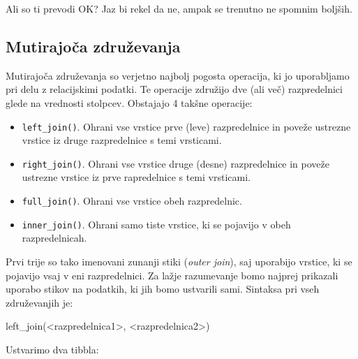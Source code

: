 \documentclass[
]{book}
\newenvironment{Shaded}{\begin{snugshade}}{\end{snugshade}}
\newcommand{\FunctionTok}[1]{\textcolor[rgb]{0.00,0.00,0.00}{#1}}
\newcommand{\NormalTok}[1]{#1}
\newcommand{\SpecialCharTok}[1]{\textcolor[rgb]{0.00,0.00,0.00}{#1}}
\providecommand{\tightlist}{%
  \setlength{\itemsep}{0pt}\setlength{\parskip}{0pt}}
\begin{document}
Ali so ti prevodi OK? Jaz bi rekel da ne, ampak se trenutno ne spomnim boljših.

\hypertarget{mutirajoux10da-zdruux17eevanja}{%
\subsection{Mutirajoča združevanja}\label{mutirajoux10da-zdruux17eevanja}}

Mutirajoča združevanja so verjetno najbolj pogosta operacija, ki jo uporabljamo pri delu z relacijskimi podatki. Te operacije združijo dve (ali več) razpredelnici glede na vrednosti stolpcev. Obstajajo 4 takšne operacije:

\begin{itemize}
\tightlist
\item
  \texttt{left\_join()}. Ohrani vse vrstice prve (leve) razpredelnice in poveže ustrezne vrstice iz druge razpredelnice s temi vrsticami.
\item
  \texttt{right\_join()}. Ohrani vse vrstice druge (desne) razpredelnice in poveže ustrezne vrstice iz prve rapredelnice s temi vrsticami.
\item
  \texttt{full\_join()}. Ohrani vse vrstice obeh razpredelnic.
\item
  \texttt{inner\_join()}. Ohrani samo tiste vrstice, ki se pojavijo v obeh razpredelnicah.
\end{itemize}

Prvi trije so tako imenovani zunanji stiki (\emph{outer join}), saj uporabijo vrstice, ki se pojavijo vsaj v eni razpredelnici. Za lažje razumevanje bomo najprej prikazali uporabo stikov na podatkih, ki jih bomo ustvarili sami. Sintaksa pri vseh združevanjih je:

\begin{Shaded}
\begin{Highlighting}[]
\FunctionTok{left\_join}\NormalTok{(}\SpecialCharTok{\textless{}}\NormalTok{razpredelnica1}\SpecialCharTok{\textgreater{}}\NormalTok{, }\SpecialCharTok{\textless{}}\NormalTok{razpredelnica2}\SpecialCharTok{\textgreater{}}\NormalTok{)}
\end{Highlighting}
\end{Shaded}

Ustvarimo dva tibbla:
\end{document}
